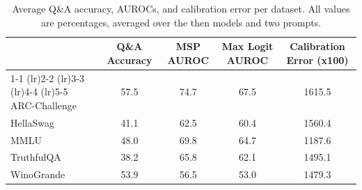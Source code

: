 \begin{table}[h]
\caption{Average Q\&A accuracy, AUROCs, and calibration error per dataset. All values are percentages, averaged over the then models and two prompts.}
\label{tab:dataset}
\centering
\begin{tabular}{lcccc}
\toprule
 & Q\&A Accuracy & MSP AUROC & Max Logit AUROC & Calibration Error (x100) \\ 
\cmidrule(lr){1-1} \cmidrule(lr){2-2} \cmidrule(lr){3-3} \cmidrule(lr){4-4} \cmidrule(lr){5-5}
ARC-Challenge & 57.5 & 74.7 & 67.5 & 1615.5\\
HellaSwag & 41.1 & 62.5 & 60.4 & 1560.4\\
MMLU & 48.0 & 69.8 & 64.7 & 1187.6\\
TruthfulQA & 38.2 & 65.8 & 62.1 & 1495.1\\
WinoGrande & 53.9 & 56.5 & 53.0 & 1479.3\\
\bottomrule
\end{tabular}
\end{table}
